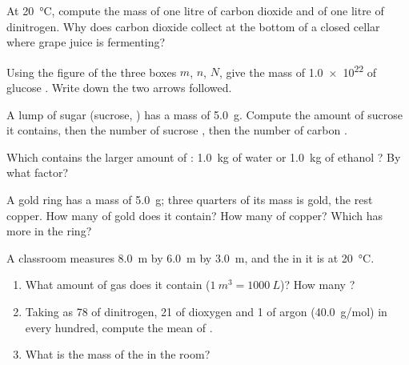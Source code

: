 \begin{exercise}[$\star\star$]\label{exo:g10:the-mole:8}
At \qty{20}{\celsius}, compute the mass of one litre of carbon dioxide
and of one litre of dinitrogen. Why does carbon dioxide collect at the
bottom of a closed cellar where grape juice is fermenting?
\end{exercise}

\begin{exercise}[$\star\star$]\label{exo:g10:the-mole:9}
Using the figure of the three boxes $m$, $n$, $N$, give the mass of
\num{1.0e22}  of glucose . Write down the two
arrows followed.
\end{exercise}

\begin{exercise}[$\star\star$]\label{exo:g10:the-mole:10}
A lump of sugar (sucrose, ) has a mass of \qty{5.0}{g}.
Compute the amount of sucrose it contains, then the number of sucrose
, then the number of carbon .
\end{exercise}

\begin{exercise}[$\star\star$]\label{exo:g10:the-mole:11}
Which contains the larger amount of : \qty{1.0}{kg} of water
 or \qty{1.0}{kg} of ethanol ? By what factor?
\end{exercise}

\begin{exercise}[$\star\star\star$]\label{exo:g10:the-mole:12}
A gold ring has a mass of \qty{5.0}{g}; three quarters of its mass is
gold, the rest copper. How many  of gold does it contain? How many
 of copper? Which  has more  in the ring?
\end{exercise}

\begin{exercise}[$\star\star\star$]\label{exo:g10:the-mole:13}
A classroom measures \qty{8.0}{m} by \qty{6.0}{m} by \qty{3.0}{m}, and
the  in it is at \qty{20}{\celsius}.
\begin{enumerate}
  \item What amount of gas does it contain ($\qty{1}{m^3} =
        \qty{1000}{L}$)? How many ?
  \item Taking  as 78  of dinitrogen, 21 of dioxygen and 1 of
        argon (\qty{40.0}{g/mol}) in every hundred, compute the mean
         of .
  \item What is the mass of the  in the room?
\end{enumerate}
\end{exercise}


